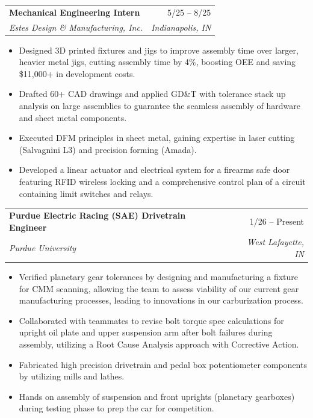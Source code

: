 \documentclass[letterpaper,11pt]{article}
\makeatletter
\newcommand{\resumeItem}[1]{
  \item\small{
    {#1 \vspace{-2pt}}
  }
}
\newcommand{\resumeSubheading}[4]{
  \vspace{-2pt}\item
    \begin{tabular*}{0.97\textwidth}[t]{l@{\extracolsep{\fill}}r}
      \textbf{#1} & #2 \\
      \textit{\small#3} & \textit{\small #4} \\
    \end{tabular*}\vspace{-7pt}
}
\newcommand{\resumeItemListStart}{\begin{itemize}[leftmargin=0.2in, label={$\bullet$}]}
\newcommand{\resumeItemListEnd}{\end{itemize}\vspace{-5pt}}
\makeatother
\begin{document}
    \resumeSubheading
      {Mechanical Engineering Intern}{5/25 -- 8/25}
      {Estes Design \& Manufacturing, Inc.}{Indianapolis, IN}
      \resumeItemListStart
        \resumeItem{Designed 3D printed fixtures and jigs to improve assembly time over larger, heavier metal jigs, cutting assembly time by 4\%, boosting OEE and saving \$11,000+ in development costs.}
        \resumeItem{Drafted 60+ CAD drawings and applied GD\&T with tolerance stack up analysis on large assemblies to guarantee the seamless assembly of hardware and sheet metal components.}
        \resumeItem{Executed DFM principles in sheet metal, gaining expertise in laser cutting (Salvagnini L3) and precision forming (Amada).}
        \resumeItem{Developed a linear actuator and electrical system for a firearms safe door featuring RFID wireless locking and a comprehensive control plan of a circuit containing limit switches and relays.}
      \resumeItemListEnd


    \resumeSubheading
      {Purdue Electric Racing (SAE) Drivetrain Engineer}{1/26 -- Present}
      {Purdue University}{West Lafayette, IN}
      \resumeItemListStart
        \resumeItem{Verified planetary gear tolerances by designing and manufacturing a fixture for CMM scanning, allowing the team to assess viability of our current gear manufacturing processes, leading to innovations in our carburization process.}
        \resumeItem{Collaborated with teammates to revise bolt torque spec calculations for upright oil plate and upper suspension arm after bolt failures during assembly, utilizing a Root Cause Analysis approach with Corrective Action.}
        \resumeItem{Fabricated high precision drivetrain and pedal box potentiometer components by utilizing mills and lathes.}
        \resumeItem{Hands on assembly of suspension and front uprights (planetary gearboxes) during testing phase to prep the car for competition.}
      \resumeItemListEnd

\end{document}
